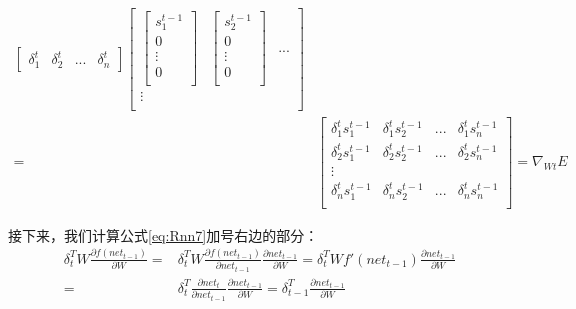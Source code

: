 \begin{align*}
	\begin{bmatrix}
		\delta_1^t & \delta_2^t & ... & \delta_n^t
	\end{bmatrix}
	\begin{bmatrix}
		\begin{bmatrix}
			s_1^{t-1} \\
			0         \\
			\vdots    \\
			0         \\
		\end{bmatrix} &
		\begin{bmatrix}
			s_2^{t-1} \\
			0         \\
			\vdots    \\
			0         \\
		\end{bmatrix} & ... \\
		\vdots                           \\
	\end{bmatrix}                                                                                                   \\
	=                                                          &
	\begin{bmatrix}
		\delta_1^ts_1^{t-1} & \delta_1^ts_2^{t-1} & ... & \delta_1^ts_n^{t-1} \\
		\delta_2^ts_1^{t-1} & \delta_2^ts_2^{t-1} & ... & \delta_2^ts_n^{t-1} \\
		\vdots                                                                \\
		\delta_n^ts_1^{t-1} & \delta_n^ts_2^{t-1} & ... & \delta_n^ts_n^{t-1} \\
	\end{bmatrix}=\nabla_{Wt}E
\end{align*}


接下来，我们计算公式\ref{eq:Rnn7}加号右边的部分：
\begin{align*}
	\delta_t^TW\frac{\partial{f({net}_{t-1})}}{\partial{W}}= & \delta_t^TW\frac{\partial{f({net}_{t-1})}}{\partial{{net}_{t-1}}}\frac{\partial{{net}_{t-1}}}{\partial{W}}=\delta_t^TWf'({net}_{t-1})\frac{\partial{{net}_{t-1}}}{\partial{W}} \\
	=                                                        & \delta_t^T\frac{\partial{{net}_t}}{\partial{{net}_{t-1}}}\frac{\partial{{net}_{t-1}}}{\partial{W}}=\delta_{t-1}^T\frac{\partial{{net}_{t-1}}}{\partial{W}}
\end{align*}



